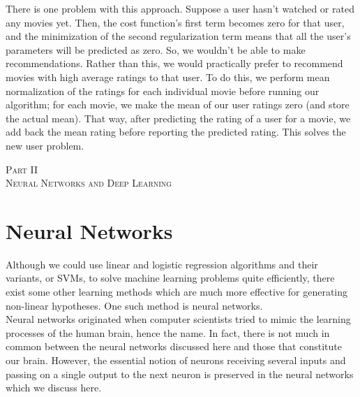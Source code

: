 \documentclass[a4paper, 12pt]{article}
\begin{document}
There is one problem with this approach. Suppose a user hasn't watched or rated any movies yet. Then, the cost function's first term becomes zero for that user, and the minimization of the second regularization term means that all the user's parameters will be predicted as zero. So, we wouldn't be able to make recommendations. Rather than this, we would practically prefer to recommend movies with high average ratings to that user. To do this, we perform mean normalization of the ratings for each individual movie before running our algorithm; for each movie, we make the mean of our user ratings zero (and store the actual mean). That way, after predicting the rating of a user for a movie, we add back the mean rating before reporting the predicted rating. This solves the new user problem.


\newpage

\vspace*{\fill}
\begin{center}
{\huge\scshape Part II \\\vspace{1cm} Neural Networks and Deep Learning}
\end{center}
\vspace*{\fill}

\newpage


\section{Neural Networks}
Although we could use linear and logistic regression algorithms and their variants, or SVMs, to solve machine learning problems quite efficiently, there exist some other learning methods which are much more effective for generating non-linear hypotheses. One such method is neural networks. \\
\break
Neural networks originated when computer scientists tried to mimic the learning processes of the human brain, hence the name. In fact, there is not much in common between the neural networks discussed here and those that constitute our brain. However, the essential notion of neurons receiving several inputs and passing on a single output to the next neuron is preserved in the neural networks which we discuss here.
\end{document}
